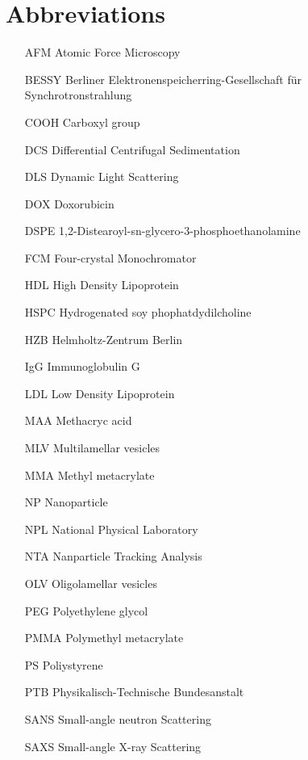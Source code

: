 \section*{Abbreviations}

\begin{itemize}
        \item   [AFM] Atomic Force Microscopy
        \item   [BESSY] Berliner Elektronenspeicherring-Gesellschaft für Synchrotronstrahlung
        \item   [COOH] Carboxyl group
        \item   [DCS] Differential Centrifugal Sedimentation
        \item   [DLS] Dynamic Light Scattering
        \item   [DOX] Doxorubicin        
        \item   [DSPE] 1,2-Distearoyl-sn-glycero-3-phosphoethanolamine
        \item   [FCM] Four-crystal Monochromator
        \item   [HDL] High Density Lipoprotein
        \item   [HSPC] Hydrogenated soy phophatdydilcholine
        \item   [HZB] Helmholtz-Zentrum Berlin
        \item   [IgG] Immunoglobulin G
        \item   [LDL] Low Density Lipoprotein
        \item   [MAA] Methacryc acid
        \item   [MLV] Multilamellar vesicles
        \item   [MMA] Methyl metacrylate        
        \item   [NP] Nanoparticle
        \item   [NPL] National Physical Laboratory
        \item   [NTA] Nanparticle Tracking Analysis        
        \item   [OLV] Oligolamellar vesicles
        \item   [PEG] Polyethylene glycol
        \item   [PMMA] Polymethyl metacrylate
        \item   [PS] Poliystyrene
        \item   [PTB] Physikalisch-Technische Bundesanstalt
        \item   [SANS] Small-angle neutron Scattering
        \item   [SAXS] Small-angle X-ray Scattering

\end{itemize}
